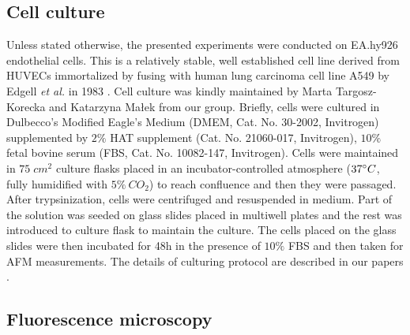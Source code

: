 \subsection{Cell culture}
Unless stated otherwise, the presented experiments were conducted on EA.hy926 endothelial cells. This is a relatively stable, well established cell line derived from \glspl{HUVEC} immortalized by fusing with human lung carcinoma cell line A549 by Edgell \emph{et al.} in 1983 \cite{Edgell1983}. Cell culture was kindly maintained by Marta Targosz-Korecka and Katarzyna Ma\l{}ek from our group. Briefly, cells were cultured in Dulbecco's Modified Eagle's Medium (DMEM, Cat. No. 30-2002, Invitrogen) supplemented by $2\%$ HAT supplement (Cat. No. 21060-017, Invitrogen), $10\%$ fetal bovine serum (FBS, Cat. No. 10082-147, Invitrogen). Cells were maintained in 
$75\;cm^2$ culture flasks placed in an incubator-controlled atmosphere
($37^\circ C$, fully humidified with $5\%\ CO_2$) to reach confluence and then they were passaged. After trypsinization, cells were centrifuged and resuspended in medium. Part of the solution was seeded on glass slides placed in multiwell plates and the rest was introduced to culture flask to maintain the culture. The cells placed on the glass slides were then incubated for 48h in the presence of $10\%$ FBS and then taken for \gls{AFM} measurements. The details of culturing protocol are described in our papers \cite{Szczygiel2011, Targosz-Korecka2013}.
\subsection{Fluorescence microscopy}

